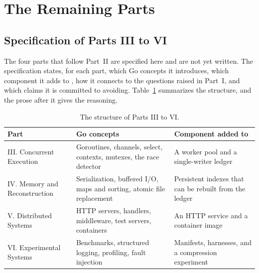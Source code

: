 \part*{The Remaining Parts}

\chapter*{Specification of Parts III to VI}

The four parts that follow Part~II are specified here and are not yet written. The specification states, for each part, which Go concepts it introduces, which component it adds to \golab{}, how it connects to the questions raised in Part~I, and which claims it is committed to avoiding. Table~\ref{tab:parts} summarizes the structure, and the prose after it gives the reasoning.

\begin{table}[ht]
\centering
\small
\begin{tabular}{@{}p{}p{}p{}@{}}
\toprule
Part & Go concepts & Component added to \golab{} \\
\midrule
III. Concurrent Execution & Goroutines, channels, select, contexts, mutexes, the race detector & A worker pool and a single-writer ledger \\
IV. Memory and Reconstruction & Serialization, buffered I/O, maps and sorting, atomic file replacement & Persistent indexes that can be rebuilt from the ledger \\
V. Distributed Systems & HTTP servers, handlers, middleware, test servers, containers & An HTTP service and a container image \\
VI. Experimental Systems & Benchmarks, structured logging, profiling, fault injection & Manifests, harnesses, and a compression experiment \\
\bottomrule
\end{tabular}
\caption{The structure of Parts III to VI.}
\label{tab:parts}
\end{table}


